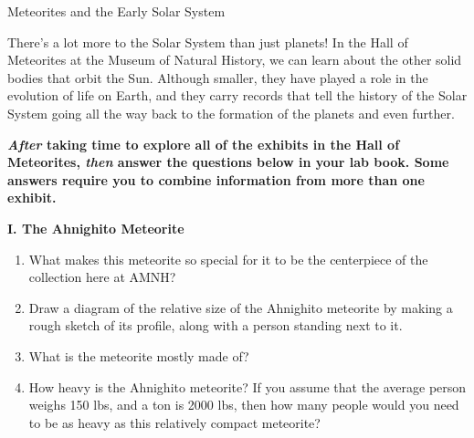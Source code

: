 \documentclass[12pt]{article}%
\begin{document}
\begin{center}
\huge{Meteorites and the Early Solar System}
\end{center}



\vspace{0.3cm}

\begin{flushleft}

There's a lot more to the Solar System than just planets! In the Hall of
Meteorites at the Museum of Natural History, we can learn about the other solid
bodies that orbit the Sun. Although smaller, they have played a role in the
evolution of life on Earth, and they carry records that tell the history of the
Solar System going all the way back to the formation of the planets and even
further.  

\vspace{0.3cm}

\textbf{\emph{After} taking time to explore all of the exhibits in the 
Hall of Meteorites, 
\emph{then} answer the questions below in your lab book. Some answers require 
you to combine information from more than one exhibit.} 

\vspace{0.3cm}

\begin{center}
\textbf{I. The Ahnighito Meteorite}
\end{center}

\begin{enumerate}
\item What makes this meteorite so special for it to be the centerpiece of the 
collection here at AMNH?

\vspace{0.3cm}

\item Draw a diagram of the relative size of the Ahnighito meteorite by making a rough
sketch of its profile, along with a person standing next to it. 

\vspace{0.3cm}

\item What is the meteorite mostly made of?  

\item How heavy is the Ahnighito meteorite?
If you assume that the average person weighs 150 lbs, and a ton is 2000 lbs, then how many people would you need to be as heavy as this relatively compact 
meteorite?


\end{enumerate}
\end{flushleft}
\end{document}
